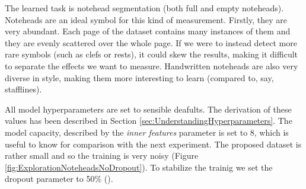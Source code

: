 The learned task is notehead segmentation (both full and empty noteheads). Noteheads are an ideal symbol for this kind of measurement. Firstly, they are very abundant. Each page of the dataset contains many instances of them and they are evenly scattered over the whole page. If we were to instead detect more rare symbols (such as clefs or rests), it could skew the results, making it difficult to separate the effects we want to measure. Handwritten noteheads are also very diverse in style, making them more interesting to learn (compared to, say, stafflines).

All model hyperparameters are set to sensible deafults. The derivation of these values has been described in Section \ref{sec:UnderstandingHyperparameters}. The model capacity, described by the \emph{inner features} parameter is set to 8, which is useful to know for comparison with the next experiment. The proposed dataset is rather small and so the training is very noisy (Figure \ref{fig:ExplorationNoteheadsNoDropout}). To stabilize the trainig we set the dropout parameter to 50\% (\cite{Dropout}).

